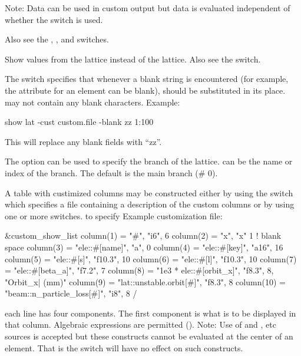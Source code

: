 {{{{{{{{\begin{description}
Note: Data can be used in custom output but data is evaluated independent of whether the
 switch is used.

Also see the , , and  switches.
%
\item[-base] \Newline
  Show values from the  lattice instead of the  lattice. Also see the  switch.
%
\item[-blank_replacement <string>] \Newline
The  switch specifies that whenever a blank string is
encountered (for example, the  attribute for an element can be blank),  should
be substituted in its place.  may not contain any blank characters. Example:
\begin{example}
  show lat -cust custom.file -blank zz 1:100
\end{example}
This will replace any blank fields with ``zz''.
%
\item[-branch] \Newline
The  option can be used to specify the branch of the lattice. 
 can be the name or index of the branch.  The default is the main
branch (\# 0).
%
\item[-custom <file_name>] \Newline
A table with custimized columns may be constructed either by using the  switch which
specifies a file containing a description of the custom columns or by using one or more  switches.
to specify  Example customization file:
\begin{example}
  &custom_show_list
    column(1)  = "#",                      "i6",     6 
    column(2)  = "x",                      "x"       1   ! blank space
    column(3)  = "ele::#[name]",           "a",      0
    column(4)  = "ele::#[key]",            "a16",   16
    column(5)  = "ele::#[s]",              "f10.3", 10
    column(6)  = "ele::#[l]",              "f10.3", 10
    column(7)  = "ele::#[beta_a]",         "f7.2",   7
    column(8)  = "1e3 * ele::#[orbit_x]",  "f8.3",   8, "Orbit_x| (mm)" 
    column(9)  = "lat::unstable.orbit[#]", "f8.3",   8 
    column(10) = "beam::n_particle_loss[#]", "i8",   8 
  /
\end{example}
each  line has four components. The first component is what is to be displayed in that
column. Algebraic expressions are permitted (). Note: Use of  and
, etc sources is accepted but these constructs cannot be evaluated at the center of an
element. That is the  switch will have no effect on such constructs.


\end{description}}}}}}}}}
